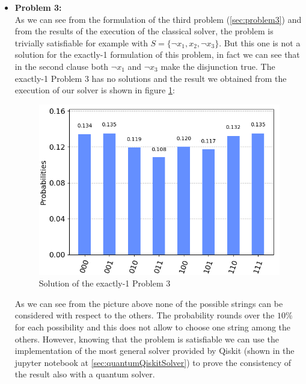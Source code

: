 \documentclass[english]{article}
\begin{document}
\begin{itemize}
					\item \textbf{Problem 3:} \\
						As we can see from the formulation of the third problem (\ref{sec:problem3}) and from the results of the execution of the classical solver, the problem is trivially satisfiable for example with $S = \{\neg x_1, x_2, \neg x_3\}$. But this one is not a solution for the exactly-1 formulation of this problem, in fact we can see that in the second clause both $\neg x_1$ and $\neg x_3$ make the disjunction true. The exactly-1 Problem 3 has no solutions and the result we obtained from the execution of our solver is shown in figure \ref{fig:problem3Solution}:
						\begin{figure}[h]
							\centering
							\includegraphics[scale=0.45]{Problem_3_Solution.png}
							\caption{
								\label{fig:problem3Solution}
								Solution of the exactly-1 Problem 3
							}
						\end{figure}
					
						As we can see from the picture above none of the possible strings can be considered with respect to the others. The probability rounds over the $10\%$ for each possibility and this does not allow to choose one string among the others. However, knowing that the problem is satisfiable we can use the implementation of the most general solver provided by Qiskit (shown in the jupyter notebook at \ref{sec:quantumQiskitSolver}) to prove the consistency of the result also with a quantum solver.
						

\end{itemize}
\end{document}
